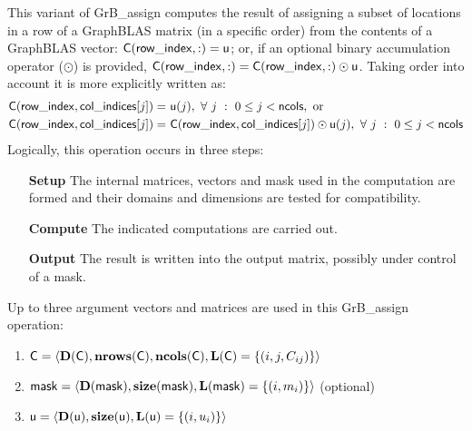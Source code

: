 This variant of {\sf GrB\_assign} computes the result of assigning a subset of
locations in a row of a GraphBLAS matrix (in a specific order) from the 
contents of a GraphBLAS vector: 
${\sf C}({\sf row\_index},:) = {\sf u}$; or, if an 
optional binary accumulation operator ($\odot$) is provided, 
${\sf C}({\sf row\_index},:) = 
{\sf C}({\sf row\_index},:) \odot {\sf u}$. Taking order into account it is
more explicitly written as:
\[
\begin{aligned}
    {\sf C}({\sf row\_index},{\sf col\_indices}[j]) = &\ {\sf u}(j),
    \ \forall \ j \ : \ 0 \leq j < {\sf ncols}, \mbox{~or~}
    \\
    {\sf C}({\sf row\_index},{\sf col\_indices}[j]) = &\ {\sf C}({\sf row\_index},{\sf col\_indices}[j]) \odot {\sf u}(j), 
    \ \forall \ j \ : \ 0 \leq j < {\sf ncols}
\end{aligned}
\]  
Logically, this operation occurs in three steps:
\begin{enumerate}[leftmargin=0.75in]
\item[\bf Setup] The internal matrices, vectors and mask used in the computation are formed 
and their domains and dimensions are tested for compatibility.
\item[\bf Compute] The indicated computations are carried out.
\item[\bf Output] The result is written into the output matrix, possibly under 
control of a mask.
\end{enumerate}

Up to three argument vectors and matrices are used in this {\sf GrB\_assign} 
operation:
\begin{enumerate}
	\item ${\sf C} = \langle \bold{D}({\sf C}),\bold{nrows}({\sf C}),
    \bold{ncols}({\sf C}),\bold{L}({\sf C}) = \{(i,j,C_{ij}) \} \rangle$
    
	\item ${\sf mask} = \langle \bold{D}({\sf mask}),\bold{size}({\sf mask}),
    \bold{L}({\sf mask}) = \{(i,m_{i}) \} \rangle$ (optional)

	\item ${\sf u} = \langle \bold{D}({\sf u}),\bold{size}({\sf u}),
    \bold{L}({\sf u}) = \{(i,u_i) \} \rangle$
\end{enumerate}

